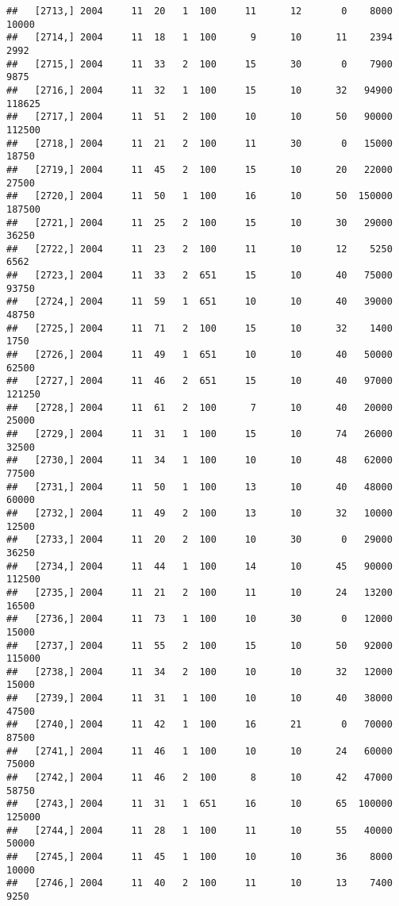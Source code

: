 \documentclass{article}\usepackage[]{graphicx}\usepackage[]{color}
\makeatletter
\newenvironment{kframe}{%
 \def\at@end@of@kframe{}%
 \ifinner\ifhmode%
  \def\at@end@of@kframe{\end{minipage}}%
  \begin{minipage}{\columnwidth}%
 \fi\fi%
 \def\FrameCommand##1{\hskip\@totalleftmargin \hskip-\fboxsep
 \colorbox{shadecolor}{##1}\hskip-\fboxsep
     \hskip-\linewidth \hskip-\@totalleftmargin \hskip\columnwidth}%
 \MakeFramed {\advance\hsize-\width
   \@totalleftmargin\z@ \linewidth\hsize
   \@setminipage}}%
 {\par\unskip\endMakeFramed%
 \at@end@of@kframe}
\newenvironment{knitrout}{}{} %
\makeatother
\begin{document}
\begin{knitrout}
\begin{kframe}
\begin{verbatim}
##   [2713,] 2004     11  20   1  100     11      12       0    8000   10000
##   [2714,] 2004     11  18   1  100      9      10      11    2394    2992
##   [2715,] 2004     11  33   2  100     15      30       0    7900    9875
##   [2716,] 2004     11  32   1  100     15      10      32   94900  118625
##   [2717,] 2004     11  51   2  100     10      10      50   90000  112500
##   [2718,] 2004     11  21   2  100     11      30       0   15000   18750
##   [2719,] 2004     11  45   2  100     15      10      20   22000   27500
##   [2720,] 2004     11  50   1  100     16      10      50  150000  187500
##   [2721,] 2004     11  25   2  100     15      10      30   29000   36250
##   [2722,] 2004     11  23   2  100     11      10      12    5250    6562
##   [2723,] 2004     11  33   2  651     15      10      40   75000   93750
##   [2724,] 2004     11  59   1  651     10      10      40   39000   48750
##   [2725,] 2004     11  71   2  100     15      10      32    1400    1750
##   [2726,] 2004     11  49   1  651     10      10      40   50000   62500
##   [2727,] 2004     11  46   2  651     15      10      40   97000  121250
##   [2728,] 2004     11  61   2  100      7      10      40   20000   25000
##   [2729,] 2004     11  31   1  100     15      10      74   26000   32500
##   [2730,] 2004     11  34   1  100     10      10      48   62000   77500
##   [2731,] 2004     11  50   1  100     13      10      40   48000   60000
##   [2732,] 2004     11  49   2  100     13      10      32   10000   12500
##   [2733,] 2004     11  20   2  100     10      30       0   29000   36250
##   [2734,] 2004     11  44   1  100     14      10      45   90000  112500
##   [2735,] 2004     11  21   2  100     11      10      24   13200   16500
##   [2736,] 2004     11  73   1  100     10      30       0   12000   15000
##   [2737,] 2004     11  55   2  100     15      10      50   92000  115000
##   [2738,] 2004     11  34   2  100     10      10      32   12000   15000
##   [2739,] 2004     11  31   1  100     10      10      40   38000   47500
##   [2740,] 2004     11  42   1  100     16      21       0   70000   87500
##   [2741,] 2004     11  46   1  100     10      10      24   60000   75000
##   [2742,] 2004     11  46   2  100      8      10      42   47000   58750
##   [2743,] 2004     11  31   1  651     16      10      65  100000  125000
##   [2744,] 2004     11  28   1  100     11      10      55   40000   50000
##   [2745,] 2004     11  45   1  100     10      10      36    8000   10000
##   [2746,] 2004     11  40   2  100     11      10      13    7400    9250

\end{verbatim}
\end{kframe}
\end{knitrout}
\end{document}
